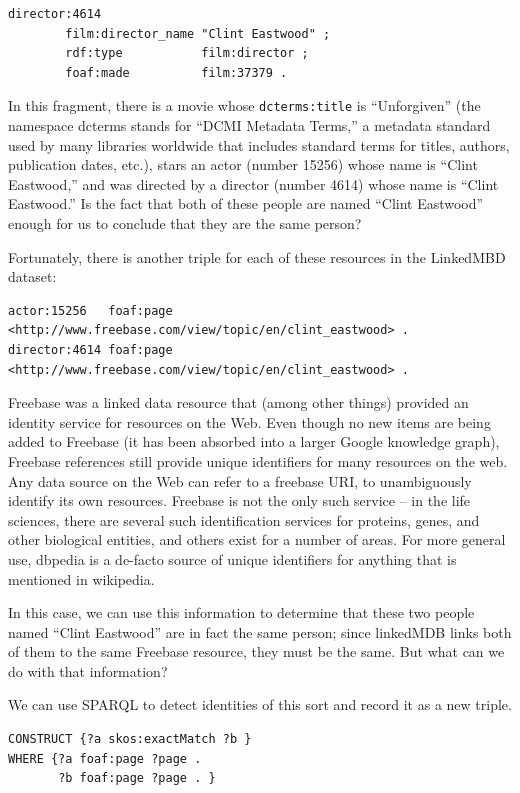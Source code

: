 \begin{challenge}
\begin{lstlisting}
director:4614  
        film:director_name "Clint Eastwood" ;
        rdf:type           film:director ;
        foaf:made          film:37379 .

\end{lstlisting}

In this fragment, there is a movie whose \texttt{dcterms:title} is ``Unforgiven'' (the
namespace dcterms stands for ``DCMI Metadata Terms,'' a metadata standard used by
many libraries worldwide that includes standard terms for titles,
authors, publication dates, etc.), stars an actor (number 15256) whose
name is ``Clint Eastwood,'' and was directed by a director (number 4614)
whose name is ``Clint Eastwood.'' Is the fact that both of these people
are named ``Clint Eastwood'' enough for us to conclude that they are the
same person?

Fortunately, there is another triple for each of these resources in the
LinkedMBD dataset:

\begin{lstlisting}
actor:15256   foaf:page  <http://www.freebase.com/view/topic/en/clint_eastwood> .
director:4614 foaf:page  <http://www.freebase.com/view/topic/en/clint_eastwood> .

\end{lstlisting}

Freebase was a linked data resource that (among other things) provided an
identity service for resources on the Web. Even though no new items are being added to Freebase
(it has been absorbed into a larger Google knowledge graph), Freebase references still provide unique
identifiers for many resources on the web. 
Any data source on the Web
can refer to a freebase URI, to unambiguously identify its own
resources. Freebase is not the only such service -- in the life
sciences, there are several such identification services for proteins,
genes, and other biological entities, and others exist for a number of
areas.  For more general use, dbpedia is a de-facto source of unique identifiers for anything that
is mentioned in wikipedia. 

In this case, we can use this information to determine that these two
people named ``Clint Eastwood'' are in fact the same person; since
linkedMDB links both of them to the same Freebase resource, they must be
the same. But what can we do with that information?

We can use SPARQL to detect identities of this sort and record it as a
new triple.

\begin{lstlisting}
CONSTRUCT {?a skos:exactMatch ?b }
WHERE {?a foaf:page ?page .
       ?b foaf:page ?page . }
\end{lstlisting}


\end{challenge}
